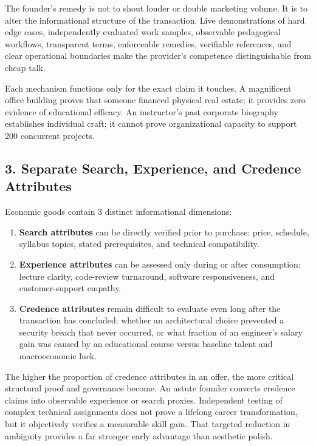 The founder's remedy is not to shout louder or double marketing volume. It is to alter the informational structure of the transaction. Live demonstrations of hard edge cases, independently evaluated work samples, observable pedagogical workflows, transparent terms, enforceable remedies, verifiable references, and clear operational boundaries make the provider's competence distinguishable from cheap talk. 

Each mechanism functions only for the exact claim it touches. A magnificent office building proves that someone financed physical real estate; it provides zero evidence of educational efficacy. An instructor's past corporate biography establishes individual craft; it cannot prove organizational capacity to support 200 concurrent projects.

\subsection*{3. Separate Search, Experience, and Credence Attributes}

Economic goods contain 3 distinct informational dimensions:
\begin{enumerate}
\item \textbf{Search attributes} can be directly verified prior to purchase: price, schedule, syllabus topics, stated prerequisites, and technical compatibility.
\item \textbf{Experience attributes} can be assessed only during or after consumption: lecture clarity, code-review turnaround, software responsiveness, and customer-support empathy.
\item \textbf{Credence attributes} remain difficult to evaluate even long after the transaction has concluded: whether an architectural choice prevented a security breach that never occurred, or what fraction of an engineer's salary gain was caused by an educational course versus baseline talent and macroeconomic luck.
\end{enumerate}

The higher the proportion of credence attributes in an offer, the more critical structural proof and governance become. An astute founder converts credence claims into observable experience or search proxies. Independent testing of complex technical assignments does not prove a lifelong career transformation, but it objectively verifies a measurable skill gain. That targeted reduction in ambiguity provides a far stronger early advantage than aesthetic polish.

